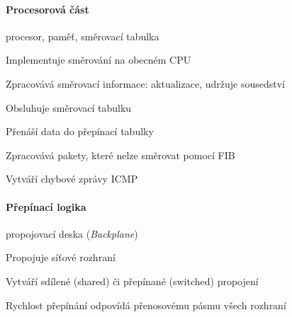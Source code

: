 \paragraph*{Procesorová část} procesor, paměť, směrovací tabulka \begin{compactitem}
    \item Implementuje směrování na obecném CPU
    \item Zpracovává směrovací informace: aktualizace, udržuje sousedství
    \item Obsluhuje směrovací tabulku
    \item Přenáší data do přepínací tabulky
    \item Zpracovává pakety, které nelze směrovat pomocí FIB
    \item Vytváří chybové zprávy ICMP
\end{compactitem}

\paragraph*{Přepínací logika} propojovací deska (\textit{Backplane})\begin{compactitem}
    \item Propojuje síťové rozhraní
    \item Vytváří sdílené (shared) či přepínané (switched) propojení
    \item Rychlost přepínání odpovídá přenosovému pásmu všech rozhraní
\end{compactitem}

